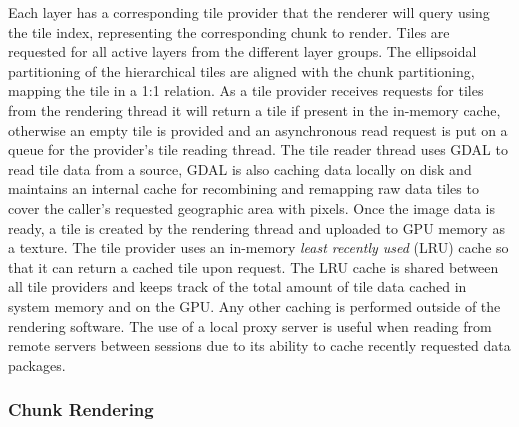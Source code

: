 \documentclass[journal]{vgtc}                %
\newcommand{\kallecomment}[1]{\textbf{[-Kalle-~}
    \textcolor{orange}{#1}
    \textbf{~]}}
\begin{document}
Each layer has a corresponding tile provider that the renderer will query using the tile index, representing the corresponding chunk to render.
Tiles are requested for all active layers from the different layer groups.
The ellipsoidal partitioning of the hierarchical tiles are aligned with the chunk partitioning, mapping the tile in a 1:1 relation.
As a tile provider receives requests for tiles from the rendering thread it will return a tile if present in the in-memory cache, otherwise an empty tile is provided and an asynchronous read request is put on a queue for the provider's tile reading thread.
The tile reader thread uses GDAL to read tile data from a source, GDAL is also caching data locally on disk and maintains an internal cache for recombining and remapping raw data tiles to cover the caller's requested geographic area with pixels.
Once the image data is ready, a tile is created by the rendering thread and uploaded to GPU memory as a texture.
The tile provider uses an in-memory \emph{least recently used} (LRU) cache so that it can return a cached tile upon request.
The LRU cache is shared between all tile providers and keeps track of the total amount of tile data cached in system memory and on the GPU.
Any other caching is performed outside of the rendering software.
The use of a local proxy server is useful when reading from remote servers between sessions due to its ability to cache recently requested data packages.



\subsubsection{Chunk Rendering} \label{sec:chunkrendering}
\end{document}

